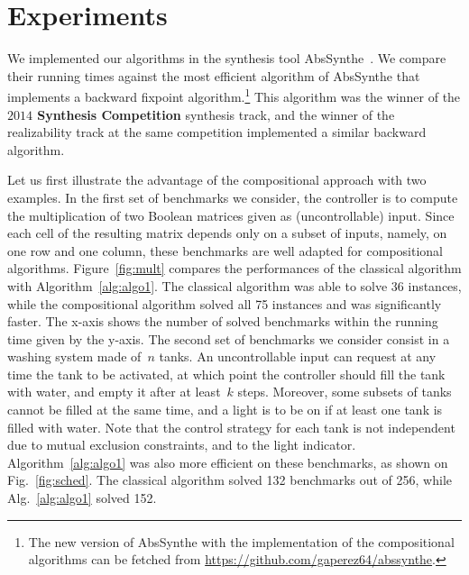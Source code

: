 \documentclass[submission,copyright,creativecommons]{eptcs}
\begin{document}
\section{Experiments}\label{sec:experiments}
We implemented our algorithms in the synthesis tool AbsSynthe~\cite{bprs14}. We
compare their running times against the most efficient algorithm of AbsSynthe
that implements a backward fixpoint algorithm.\footnote{The new version of
	AbsSynthe with the implementation of the compositional algorithms can be
	fetched from \url{https://github.com/gaperez64/abssynthe}.}
This algorithm was the winner of the \textbf{$2014$ Synthesis Competition}
synthesis track, and the winner of the realizability track at the same
competition implemented a similar backward algorithm.

Let us first illustrate the advantage of the compositional approach
with two examples. In the first set of benchmarks we consider, the controller is to
compute the multiplication of two Boolean matrices given as (uncontrollable) input.
Since each cell of the resulting matrix
depends only on a subset of inputs, namely, on one row and one column, these
benchmarks are well adapted for compositional algorithms. 
Figure~\ref{fig:mult} compares the performances of the classical algorithm with
Algorithm~\ref{alg:algo1}. The classical algorithm was able to solve 36 instances,
while the compositional algorithm solved all 75 instances and was significantly
faster.
The x-axis shows the number of solved benchmarks
within the running time given by the y-axis.  
The second set of benchmarks we consider consist in a washing system made of~$n$
tanks. An uncontrollable input can request at any time the tank to be activated,
at which point the controller should fill the tank with water, and empty it 
after at least~$k$ steps. Moreover, some subsets of tanks cannot be filled at
the same time, and a light is to be on if at least one tank is filled with water.
Note that the control strategy for each tank is not independent due to mutual
exclusion constraints, and to the light indicator.
Algorithm~\ref{alg:algo1} was also more efficient on these benchmarks, as shown
on Fig.~\ref{fig:sched}. The classical algorithm solved 132 benchmarks out of 256, 
while Alg.~\ref{alg:algo1} solved 152.
\end{document}
